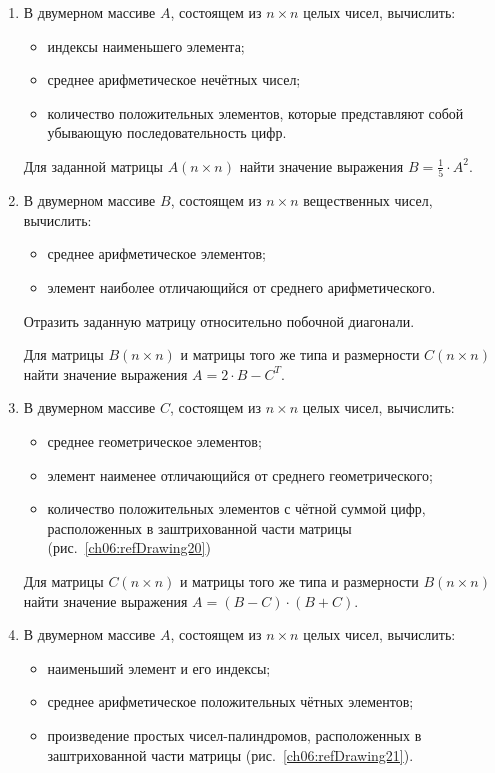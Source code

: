 \begin{enumerate}
\item В двумерном массиве $A$, состоящем из $n\times n$ целых чисел, вычислить: 

\begin{itemize}
\item индексы наименьшего элемента;
\item среднее арифметическое нечётных чисел;
\item количество положительных элементов, которые представляют собой  убывающую последовательность цифр.
\end{itemize}

Для заданной матрицы $A(n\times n)$ найти значение выражения  $B=\frac{1}{5}\cdot A^2$.
\item В двумерном массиве $B$, состоящем из $n\times n$ вещественных чисел, вычислить:
\begin{itemize}
\item среднее арифметическое элементов;
\item элемент наиболее отличающийся от среднего арифметического.
\end{itemize}

Отразить заданную матрицу относительно побочной диагонали.

Для матрицы $B(n\times n)$ и матрицы того же типа и размерности $C(n\times n)$
найти значение выражения  $A=2\cdot B-C^T$.
\item В двумерном массиве $C$, состоящем из $n\times n$ целых чисел, вычислить:

\begin{itemize}
\item среднее геометрическое элементов;
\item элемент наименее отличающийся от среднего геометрического;
\item количество положительных элементов с чётной суммой цифр, расположенных в заштрихованной 
части матрицы (рис.~\ref{ch06:refDrawing20})
\end{itemize}
Для матрицы $C(n\times n)$ и матрицы того же типа и размерности $B(n\times n)$
найти значение выражения  $A=(B-C)\cdot (B+C)$.


\item В двумерном массиве $A$, состоящем из $n\times n$ целых чисел, вычислить:

\begin{itemize}
\item наименьший элемент и его индексы;
\item среднее арифметическое положительных чётных элементов;
\item произведение простых чисел-палиндромов, расположенных в заштрихованной 
части матрицы (рис.~\ref{ch06:refDrawing21}).
\end{itemize}


\end{enumerate}
